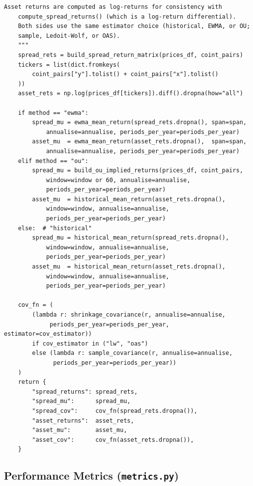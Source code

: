 \documentclass[a4paper]{report}
\begin{document}
\begin{Verbatim}[fontsize=\footnotesize, baselinestretch=0.85]
    Asset returns are computed as log-returns for consistency with
    compute_spread_returns() (which is a log-return differential).
    Both sides use the same estimator choice (historical, EWMA, or OU;
    sample, Ledoit-Wolf, or OAS).
    """
    spread_rets = build_spread_return_matrix(prices_df, coint_pairs)
    tickers = list(dict.fromkeys(
        coint_pairs["y"].tolist() + coint_pairs["x"].tolist()
    ))
    asset_rets = np.log(prices_df[tickers]).diff().dropna(how="all")

    if method == "ewma":
        spread_mu = ewma_mean_return(spread_rets.dropna(), span=span,
            annualise=annualise, periods_per_year=periods_per_year)
        asset_mu  = ewma_mean_return(asset_rets.dropna(),  span=span,
            annualise=annualise, periods_per_year=periods_per_year)
    elif method == "ou":
        spread_mu = build_ou_implied_returns(prices_df, coint_pairs,
            window=window or 60, annualise=annualise,
            periods_per_year=periods_per_year)
        asset_mu  = historical_mean_return(asset_rets.dropna(),
            window=window, annualise=annualise,
            periods_per_year=periods_per_year)
    else:  # "historical"
        spread_mu = historical_mean_return(spread_rets.dropna(),
            window=window, annualise=annualise,
            periods_per_year=periods_per_year)
        asset_mu  = historical_mean_return(asset_rets.dropna(),
            window=window, annualise=annualise,
            periods_per_year=periods_per_year)

    cov_fn = (
        (lambda r: shrinkage_covariance(r, annualise=annualise,
             periods_per_year=periods_per_year, estimator=cov_estimator))
        if cov_estimator in ("lw", "oas")
        else (lambda r: sample_covariance(r, annualise=annualise,
              periods_per_year=periods_per_year))
    )
    return {
        "spread_returns": spread_rets,
        "spread_mu":      spread_mu,
        "spread_cov":     cov_fn(spread_rets.dropna()),
        "asset_returns":  asset_rets,
        "asset_mu":       asset_mu,
        "asset_cov":      cov_fn(asset_rets.dropna()),
    }
\end{Verbatim}

\subsection{Performance Metrics (\texttt{metrics.py})}
\end{document}
